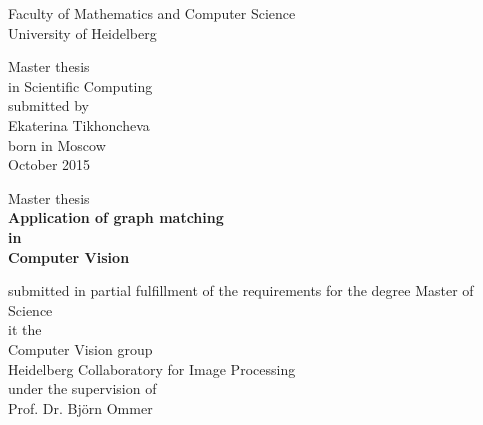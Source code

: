 \thispagestyle{empty}
\begin{center}
  \renewcommand{\baselinestretch}{2.00}
  \Large %
  Faculty of Mathematics and Computer Science\\
  \large University of Heidelberg
  \par\vfill\normalfont
  Master thesis\\
  in Scientific Computing\\
  submitted by\\
  Ekaterina Tikhoncheva\\
  born in Moscow\\
  \vspace{2\baselineskip}
  October 2015
\end{center}
\newpage

\thispagestyle{empty}
\begin{center}
  \renewcommand{\baselinestretch}{2.00}
  \large Master thesis \\
  \Large\bfseries %
    Application of graph matching\\
    in\\
    Computer Vision
  \par
  \vfill
  \large\normalfont
  submitted in partial fulfillment of the requirements for the degree Master of Science\\ 
  it the\\
  Computer Vision group\\
  Heidelberg Collaboratory for Image Processing\\
  \vspace{\baselineskip}
  under the supervision of\\
  Prof. Dr. Björn Ommer
\end{center}\par
\vspace{5\baselineskip}

\onehalfspacing